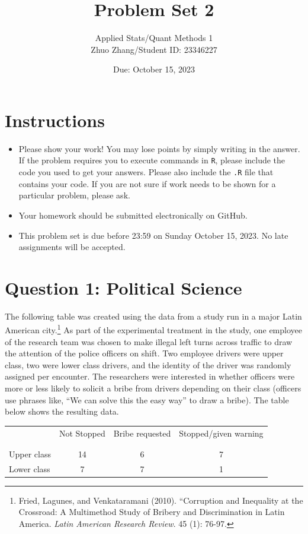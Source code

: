 \documentclass[12pt,letterpaper]{article}
\title{Problem Set 2}
\date{Due: October 15, 2023}
\author{Applied Stats/Quant Methods 1\\
Zhuo Zhang/Student ID: 23346227}
\begin{document}
	\maketitle
	\section*{Instructions}
\begin{itemize}
	\item Please show your work! You may lose points by simply writing in the answer. If the problem requires you to execute commands in \texttt{R}, please include the code you used to get your answers. Please also include the \texttt{.R} file that contains your code. If you are not sure if work needs to be shown for a particular problem, please ask.
	\item Your homework should be submitted electronically on GitHub.
	\item This problem set is due before 23:59 on Sunday October 15, 2023. No late assignments will be accepted.

\end{itemize}

	
	\vspace{.5cm}
	\section*{Question 1: Political Science}
		\vspace{.25cm}
	The following table was created using the data from a study run in a major Latin American city.\footnote{Fried, Lagunes, and Venkataramani (2010). ``Corruption and Inequality at the Crossroad: A Multimethod Study of Bribery and Discrimination in Latin America. \textit{Latin American Research Review}. 45 (1): 76-97.} As part of the experimental treatment in the study, one employee of the research team was chosen to make illegal left turns across traffic to draw the attention of the police officers on shift. Two employee drivers were upper class, two were lower class drivers, and the identity of the driver was randomly assigned per encounter. The researchers were interested in whether officers were more or less likely to solicit a bribe from drivers depending on their class (officers use phrases like, ``We can solve this the easy way'' to draw a bribe). The table below shows the resulting data.

\newpage
\begin{table}[h!]
	\centering
	\begin{tabular}{l | c c c }
		& Not Stopped & Bribe requested & Stopped/given warning \\
		\\[-1.8ex] 
		\hline \\[-1.8ex]
		Upper class & 14 & 6 & 7 \\
		Lower class & 7 & 7 & 1 \\
		\hline
	\end{tabular}
\end{table}
\end{document}
